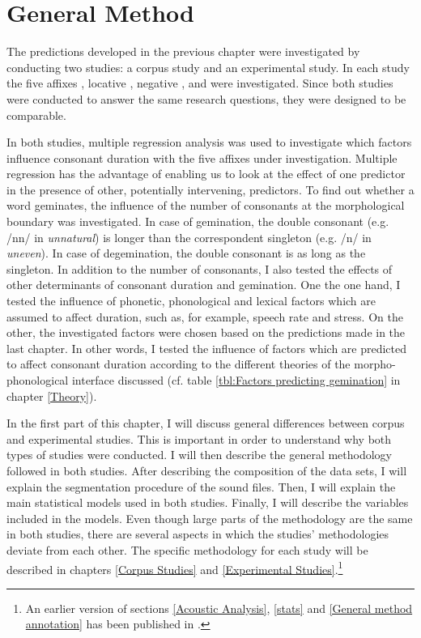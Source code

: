\chapter{General Method} \label{General Method}

\vspace*{-0.3cm}

The predictions developed in the previous chapter were investigated by conducting two studies: a corpus study and an experimental study. In each study the five affixes , locative , negative ,  and  were investigated. 
Since both studies were conducted to answer the same research questions, they were designed to be comparable.  

In both studies, multiple regression analysis was used to investigate which factors influence consonant duration with the five affixes under investigation. Multiple regression has the advantage of enabling us to look at the effect of one predictor in the presence of other, potentially intervening, predictors.  
To find out whether a word geminates, the influence of the number of consonants at the morphological boundary was investigated. In case of gemination, the double consonant (e.g. /nn/ in \textit{unnatural}) is longer than the correspondent singleton (e.g. /n/ in \textit{uneven}). In case of degemination, the double consonant is as long as the singleton. In addition to the number of consonants, I also tested the effects of other determinants of consonant duration and gemination. One the one hand, I tested the influence of phonetic, phonological and lexical factors which are assumed to affect duration, such as, for example, speech rate and stress. On the other, the investigated factors were chosen based on the predictions made in the last chapter. In other words, I tested the influence of factors which are predicted to affect consonant duration according to the different theories of the morpho-phonological interface discussed (cf. table \ref{tbl:Factors predicting gemination} in chapter \ref{Theory}). 




In the first part of this chapter, I will discuss general differences between corpus and experimental studies. This is important in order to understand why both types of studies were conducted. I will then describe the general methodology followed in both studies. After describing the composition of the data sets, I will explain the segmentation procedure of the sound files. Then, I will explain the main statistical models used in both studies. Finally, I will describe the variables included in the models.
Even though large parts of the methodology are the same in both studies, there are several aspects in which the studies' methodologies deviate from each other. The specific methodology for each study will be described in chapters \ref{Corpus Studies} and \ref{Experimental Studies}.\footnote{An earlier version of sections \ref{Acoustic Analysis}, \ref{stats}  and \ref{General method annotation} has been published in \cite{BenHedia.2017}.}


